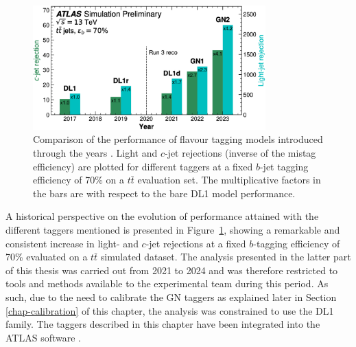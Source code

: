 \begin{figure}[h!]
  \center
  \includegraphics[width=0.8\textwidth]{Images/FTAG/storyFtag.png}
  \caption{Comparison of the performance of flavour tagging models introduced through the years \cite{ATL-PLOT-FTAG-2023-01}. Light and $c$-jet rejections (inverse of the mistag  efficiency) are plotted for different taggers at a fixed $b$-jet tagging efficiency of 70\% on a $t\bar{t}$ evaluation set. The multiplicative factors in the bars are with respect to the bare DL1 model performance.} 
  \label{fig:storyFtag}
\end{figure}

A historical perspective on the evolution of performance attained with the different taggers mentioned is presented in Figure~\ref{fig:storyFtag}, showing a remarkable and consistent increase in light- and $c$-jet rejections at a fixed $b$-tagging efficiency of 70\% evaluated on a $t\bar{t}$ simulated dataset. The analysis presented in the latter part of this thesis was carried out from 2021 to 2024 and was therefore restricted to tools and methods available to the experimental team during this period. As such, due to the need to calibrate the GN taggers as explained later in Section \ref{chap-calibration} of this chapter, the analysis was constrained to use the DL1 family. The taggers described in this chapter have been integrated into the ATLAS software \cite{ATL-SOFT-PUB-2021-001}. 

